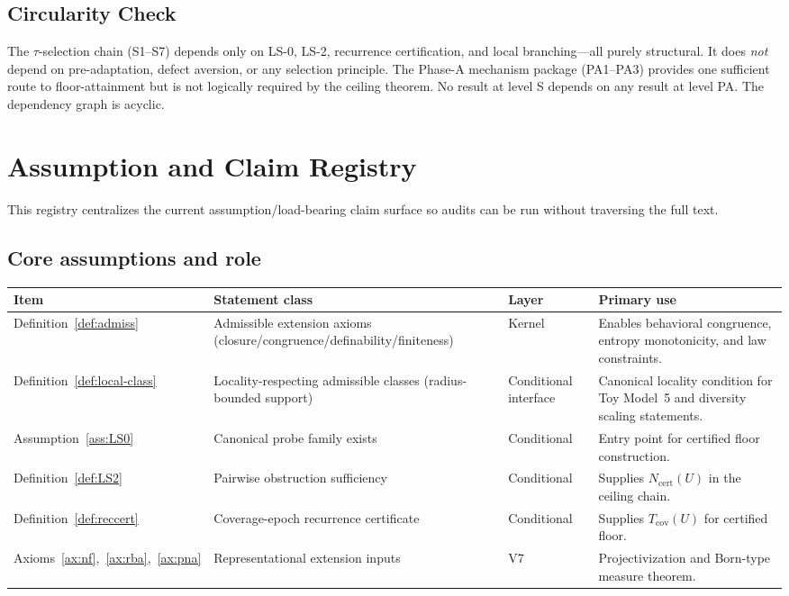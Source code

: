 \documentclass[11pt,a4paper]{article}
\theoremstyle{definition}
\theoremstyle{remark}
\begin{document}
\subsection*{Circularity Check}
The $\tau$-selection chain (S1--S7) depends only on LS-0, LS-2, recurrence certification, and local branching---all purely structural. It does \emph{not} depend on pre-adaptation, defect aversion, or any selection principle. The Phase-A mechanism package (PA1--PA3) provides one sufficient route to floor-attainment but is not logically required by the ceiling theorem. No result at level S depends on any result at level PA. The dependency graph is acyclic.


\section{Assumption and Claim Registry}\label{app:registry}

This registry centralizes the current assumption/load-bearing claim surface so audits can be run without traversing the full text.

\subsection*{Core assumptions and role}
\begin{center}\small
\begin{tabular}{p{2.7cm}p{3.4cm}p{2.2cm}p{3.8cm}}
\toprule
\textbf{Item} & \textbf{Statement class} & \textbf{Layer} & \textbf{Primary use} \\
\midrule
Definition~\ref{def:admiss} & Admissible extension axioms (closure/congruence/definability/finiteness) & Kernel & Enables behavioral congruence, entropy monotonicity, and law constraints. \\
\addlinespace
Definition~\ref{def:local-class} & Locality-respecting admissible classes (radius-bounded support) & Conditional interface & Canonical locality condition for Toy Model~5 and diversity scaling statements. \\
\addlinespace
Assumption~\ref{ass:LS0} & Canonical probe family exists & Conditional & Entry point for certified floor construction. \\
\addlinespace
Definition~\ref{def:LS2} & Pairwise obstruction sufficiency & Conditional & Supplies $N_{\mathrm{cert}}(U)$ in the ceiling chain. \\
\addlinespace
Definition~\ref{def:reccert} & Coverage-epoch recurrence certificate & Conditional & Supplies $T_{\mathrm{cov}}(U)$ for certified floor. \\
\addlinespace
Axioms~\ref{ax:nf},~\ref{ax:rba},~\ref{ax:pna} & Representational extension inputs & V7 & Projectivization and Born-type measure theorem. \\
\bottomrule
\end{tabular}
\end{center}
\end{document}
